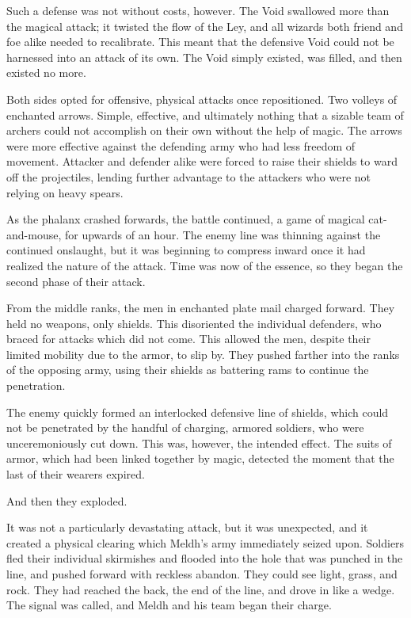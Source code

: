 Such a defense was not without costs, however. The Void swallowed more than the magical attack; it twisted the flow of the Ley, and all wizards both friend and foe alike needed to recalibrate. This meant that the defensive Void could not be harnessed into an attack of its own. The Void simply existed, was filled, and then existed no more.

Both sides opted for offensive, physical attacks once repositioned. Two volleys of enchanted arrows. Simple, effective, and ultimately nothing that a sizable team of archers could not accomplish on their own without the help of magic. The arrows were more effective against the defending army who had less freedom of movement. Attacker and defender alike were forced to raise their shields to ward off the projectiles, lending further advantage to the attackers who were not relying on heavy spears.

As the phalanx crashed forwards, the battle continued, a game of magical cat-and-mouse, for upwards of an hour. The enemy line was thinning against the continued onslaught, but it was beginning to compress inward once it had realized the nature of the attack. Time was now of the essence, so they began the second phase of their attack.

From the middle ranks, the men in enchanted plate mail charged forward. They held no weapons, only shields. This disoriented the individual defenders, who braced for attacks which did not come. This allowed the men, despite their limited mobility due to the armor, to slip by. They pushed farther into the ranks of the opposing army, using their shields as battering rams to continue the penetration.

The enemy quickly formed an interlocked defensive line of shields, which could not be penetrated by the handful of charging, armored soldiers, who were unceremoniously cut down. This was, however, the intended effect. The suits of armor, which had been linked together by magic, detected the moment that the last of their wearers expired.

And then they exploded.

It was not a particularly devastating attack, but it was unexpected, and it created a physical clearing which Meldh’s army immediately seized upon. Soldiers fled their individual skirmishes and flooded into the hole that was punched in the line, and pushed forward with reckless abandon. They could see light, grass, and rock. They had reached the back, the end of the line, and drove in like a wedge. The signal was called, and Meldh and his team began their charge.

